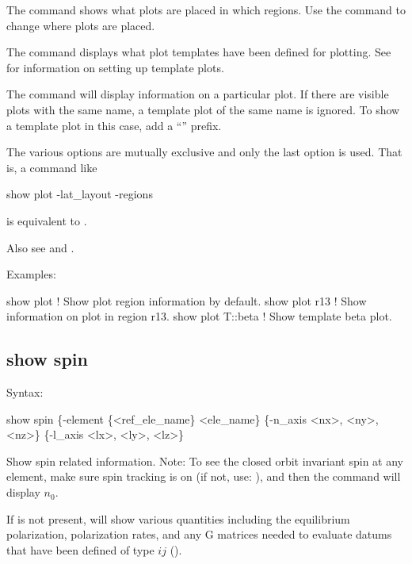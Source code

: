 {{{{{{{{{The  command shows what plots are placed in which regions. Use the 
command to change where plots are placed.

The  command displays what plot templates have been defined for plotting.
See  for information on setting up template plots.

The  command will display information on a particular plot. If
there are visible plots with the same name, a template plot of the same name is ignored. To show a
template plot in this case, add a ``'' prefix.

The various  options are mutually exclusive and only the last option is used. That is,
a command like
\begin{example}
  show plot -lat_layout -regions
\end{example}
is equivalent to .

Also see  and .

Examples:
\begin{example}
  show plot         ! Show plot region information by default.
  show plot r13     ! Show information on plot in region r13.
  show plot T::beta ! Show template beta plot.
\end{example}


\subsection{show spin}
\label{s:show.spin}

Syntax:
\begin{example}
  show spin \{-element \{<ref_ele_name\} <ele_name\} 
                                    \{-n_axis <nx>, <ny>, <nz>\} \{-l_axis <lx>, <ly>, <lz>\}
\end{example}

Show spin related information. 
Note: To see the closed orbit invariant spin at any element, make sure spin tracking is on (if not,
use: ), and then the  command will display $n_0$.

If  is not present,  will show various quantities including the
equilibrium polarization, polarization rates, and any G matrices needed to evaluate datums that
have been defined of type $ij$ ().

}}}}}}}}}
